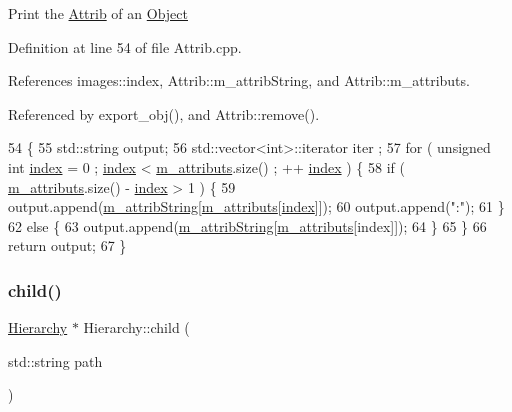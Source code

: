 Print the \hyperlink{classAttrib}{Attrib} of an \hyperlink{classObject}{Object} 

Definition at line 54 of file Attrib.\+cpp.



References images\+::index, Attrib\+::m\+\_\+attrib\+String, and Attrib\+::m\+\_\+attributs.



Referenced by export\+\_\+obj(), and Attrib\+::remove().


\begin{DoxyCode}
54                             \{
55   std::string output;
56   std::vector<int>::iterator iter ;
57   \textcolor{keywordflow}{for} ( \textcolor{keywordtype}{unsigned} \textcolor{keywordtype}{int} \hyperlink{namespaceimages_a54407fd574970b3178647ae096321a57}{index} = 0 ; \hyperlink{namespaceimages_a54407fd574970b3178647ae096321a57}{index} < \hyperlink{classAttrib_ac4bd58a0cc6b38a3b711d609a3d3aacc}{m\_attributs}.size() ; ++
      \hyperlink{namespaceimages_a54407fd574970b3178647ae096321a57}{index} ) \{
58     \textcolor{keywordflow}{if} ( \hyperlink{classAttrib_ac4bd58a0cc6b38a3b711d609a3d3aacc}{m\_attributs}.size() - \hyperlink{namespaceimages_a54407fd574970b3178647ae096321a57}{index} > 1 ) \{
59       output.append(\hyperlink{classAttrib_a3414521d7a82476e874b25a5407b5e63}{m\_attribString}[\hyperlink{classAttrib_ac4bd58a0cc6b38a3b711d609a3d3aacc}{m\_attributs}[\hyperlink{namespaceimages_a54407fd574970b3178647ae096321a57}{index}]]);
60       output.append(\textcolor{stringliteral}{":"});
61     \}
62     \textcolor{keywordflow}{else} \{
63       output.append(\hyperlink{classAttrib_a3414521d7a82476e874b25a5407b5e63}{m\_attribString}[\hyperlink{classAttrib_ac4bd58a0cc6b38a3b711d609a3d3aacc}{m\_attributs}[index]]);
64     \}
65   \}
66   \textcolor{keywordflow}{return} output;
67 \}
\end{DoxyCode}
\mbox{\label{classHierarchy_a1e207f973c694b538bf90107b4868817}} 
\subsubsection{\texorpdfstring{child()}{child()}}
{\footnotesize\ttfamily \hyperlink{classHierarchy}{Hierarchy} $\ast$ Hierarchy\+::child (\begin{DoxyParamCaption}\item[{std\+::string}]{path }\end{DoxyParamCaption})}



